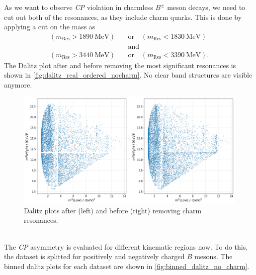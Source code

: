 As we want to observe \textit{CP} violation in charmless $B^{\pm}$ meson decays, we need to cut out both of the resonances, as they include charm quarks. This is done by applying a cut on the mass as 
\begin{align*}
  (m_{\mathrm{Res}} > \qty{1890}{\mega\electronvolt}) \quad &\mathrm{or} \quad (m_{\mathrm{Res}} < \qty{1830}{\mega\electronvolt})\\
  &\mathrm{and} \\
  (m_{\mathrm{Res}} > \qty{3440}{\mega\electronvolt}) \quad &\mathrm{or} \quad (m_{\mathrm{Res}} < \qty{3390}{\mega\electronvolt}).
\end{align*}
The Dalitz plot after and before removing the most significant resonances is shown in \autoref{fig:dalitz_real_ordered_nocharm}. No clear band structures are visible anymore.
\begin{figure}
  \centering
  \includegraphics[width = .7\textwidth]{"content/pics/dalitz_real_ordered_no_charm.png"}
  \caption{Dalitz plots after (left) and before (right) removing charm resonances.}
  \label{fig:dalitz_real_ordered_nocharm}
\end{figure}
\\The \textit{CP} asymmetry is evaluated for different kinematic regions now. To do this, the dataset is splitted for positively and negatively charged $B$ mesons. The binned dalitz plots for each dataset are shown in \autoref{fig:binned_dalitz_no_charm}.
